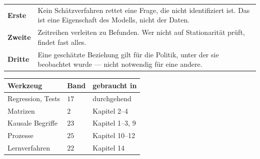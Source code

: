 \begin{warnung}
\begin{center}
{\small
\renewcommand{\arraystretch}{1.55}
\begin{tabular}{@{}P{2.2cm}P{6.4cm}@{}}
\toprule
\textbf{Erste} & Kein Schätzverfahren rettet eine Frage, die nicht identifiziert ist. Das ist eine Eigenschaft des Modells, nicht der Daten.\\
\textbf{Zweite} & Zeitreihen verleiten zu Befunden. Wer nicht auf Stationarität prüft, findet fast alles.\\
\textbf{Dritte} & Eine geschätzte Beziehung gilt für die Politik, unter der sie beobachtet wurde --- nicht notwendig für eine andere.\\
\bottomrule
\end{tabular}}
\end{center}

\begin{center}
\begin{minipage}{0.88\textwidth}
\end{minipage}
\end{center}
\end{warnung}

\begin{merksatz}
\begin{center}
{\small
\renewcommand{\arraystretch}{1.48}
\begin{tabular}{@{}P{3.0cm}P{1.6cm}P{3.0cm}@{}}
\toprule
\textbf{Werkzeug} & \textbf{Band} & \textbf{gebraucht in}\\
\midrule
Regression, Tests & $17$ & durchgehend\\
Matrizen & $2$ & Kapitel 2--4\\
Kausale Begriffe & $23$ & Kapitel 1--3, 9\\
Prozesse & $25$ & Kapitel 10--12\\
Lernverfahren & $22$ & Kapitel 14\\
\bottomrule
\end{tabular}}
\end{center}
\end{merksatz}
